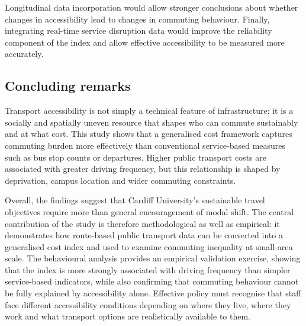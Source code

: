 \documentclass[11pt,a4paper]{article}
\begin{document}
Longitudinal data incorporation would allow stronger conclusions about whether changes in accessibility lead to changes in commuting behaviour. Finally, integrating real-time service disruption data would improve the reliability component of the index and allow effective accessibility to be measured more accurately.

\subsection{Concluding remarks}

Transport accessibility is not simply a technical feature of infrastructure; it is a socially and spatially uneven resource that shapes who can commute sustainably and at what cost. This study shows that a generalised cost framework captures commuting burden more effectively than conventional service-based measures such as bus stop counts or departures. Higher public transport costs are associated with greater driving frequency, but this relationship is shaped by deprivation, campus location and wider commuting constraints.

Overall, the findings suggest that Cardiff University's sustainable travel objectives require more than general encouragement of modal shift. The central contribution of the study is therefore methodological as well as empirical: it demonstrates how route-based public transport data can be converted into a generalised cost index and used to examine commuting inequality at small-area scale. The behavioural analysis provides an empirical validation exercise, showing that the index is more strongly associated with driving frequency than simpler service-based indicators, while also confirming that commuting behaviour cannot be fully explained by accessibility alone. Effective policy must recognise that staff face different accessibility conditions depending on where they live, where they work and what transport options are realistically available to them.
\end{document}
